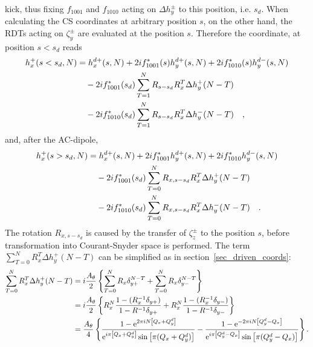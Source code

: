 kick, thus fixing $f_{1001}$ and $f_{1010}$ acting on $\Delta h_y^\pm$ to this position, i.e. $s_d$.
When calculating the CS coordinates at arbitrary position $s$, on the other hand, the RDTs acting on
$\zeta_y^\pm$ are evaluated at the position $s$. Therefore the coordinate, at position $s<s_d$ reads
%
\begin{align}
    h_x^+(s<s_d, N) &= h_x^{d+}(s,N)
        + 2if_{1001}^*(s) h_y^{d+} (s, N)
        + 2if_{1010}^*(s) h_y^{d-} (s, N) \notag \\
        & \quad - 2if_{1001}^*(s_d) \sum\limits_{T = 1}^N R_{s-s_d}R_x^{T}\Delta h_y^+(N-T) \notag \\
        & \quad - 2if_{1010}^*(s_d) \sum\limits_{T = 1}^N R_{s-s_d}R_x^{T}\Delta h_y^-(N-T)
        \quad ,
        \notag \\
\end{align}
%
and, after the AC-dipole,
%
\begin{align}
    h_x^+(s>s_d, N) &= h_x^{d+}(s,N)
        + 2if_{1001}^* h_y^{d+} (s, N)
        + 2if_{1010}^* h_y^{d-} (s, N) \notag \\
        & \quad - 2if_{1001}^*(s_d) \sum\limits_{T = 0}^N R_{x,s-s_d}R_x^{T}\Delta h_y^+(N-T) \notag \\
        & \quad - 2if_{1010}^*(s_d) \sum\limits_{T = 0}^N R_{x,s-s_d}R_x^{T}\Delta h_y^-(N-T)
        \quad .
\end{align}
%
The rotation $R_{x,s-s_d}$ is caused by the transfer of $\zeta_z^\pm$ to the position $s$,
before transformation into Courant-Snyder space is performed. 
The term $\sum\limits_{T = 0}^N R_x^{T}\Delta h_y^+(N-T) $ can be simplified as in section~\ref{sec_driven_coords}:
%
\begin{align}
    \sum\limits_{T=0}^N R_x^T \Delta h_y^+(N-T)
        &=
        i\frac{A_\theta}{2} \left\{
            \sum\limits_{T=0}^N R_x \delta_{y+}^{N-T}
            +\sum\limits_{T=0}^N R_x \delta_{y-}^{N-T}
        \right\}
        \notag \\
        &=
        i\frac{A_\theta}{2} \left\{
            R_x^N\frac{1-(R_x^{-1}\delta_{y+})}{1-R^{-1}\delta_{y+}}
            +R_x^N\frac{1-(R_x^{-1}\delta_{y-})}{1-R^{-1}\delta_{y-}}
        \right\}
        \notag \\
        &=
        \frac{A_\theta}{4} \left\{
            \frac{1-\text{e}^{2\pi i N\left[ Q_x + Q_y^d \right]}}{\text{e}^{i\pi \left[Q_x+Q_y^d\right]}\sin\left[\pi (Q_x+Q_y^d)\right]}
            -\frac{1-\text{e}^{-2\pi i N\left[ Q_y^d - Q_x \right]}}{\text{e}^{i\pi \left[Q_y^d-Q_x\right] }\sin\left[\pi (Q_y^d-Q_x)\right]}
        \right\}
        .
\end{align}

